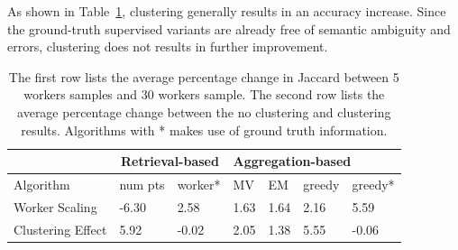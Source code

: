 \par \noindent As shown in Table~\ref{statsTable}, clustering generally results in an accuracy increase. Since the ground-truth supervised variants are already free of semantic ambiguity and errors, clustering does not results in further improvement. %
\begin{table}[h!]
   \small
     \setlength\tabcolsep{1.5pt}
      \begin{tabular}{l|l|l|l|l|l|l}
         & \multicolumn{2}{c|}{Retrieval-based} & \multicolumn{4}{l}{Aggregation-based} \\ \hline
      Algorithm         & num pts         & worker*        & MV    & EM    & greedy  & greedy*  \\ \hline
      Worker Scaling    & -6.30           & 2.58               & 1.63  & 1.64  & 2.16    & 5.59         \\ \hline
      Clustering Effect & 5.92            & -0.02              & 2.05  & 1.38  & 5.55    & -0.06       
      \end{tabular}
      \caption{The first row lists the average percentage change in Jaccard between 5 workers samples and 30 workers sample. The second row lists the average percentage change between the no clustering and clustering results. Algorithms with * makes use of ground truth information.}
      \label{statsTable}
\end{table}